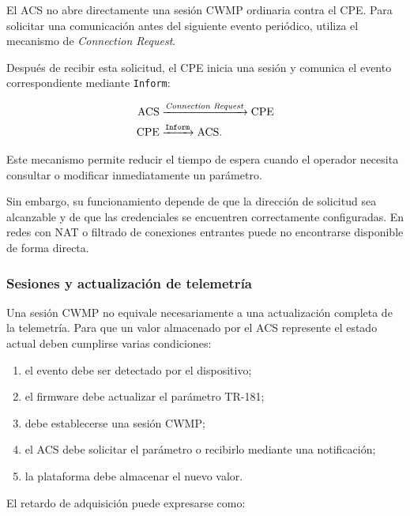 El ACS no abre directamente una sesión CWMP ordinaria contra el CPE. Para
solicitar una comunicación antes del siguiente evento periódico, utiliza
el mecanismo de \textit{Connection Request}.

Después de recibir esta solicitud, el CPE inicia una sesión y comunica el
evento correspondiente mediante \texttt{Inform}:

\[
\begin{aligned}
    \text{ACS}
    &\xrightarrow{\text{\textit{Connection Request}}}
    \text{CPE}\\
    \text{CPE}
    &\xrightarrow{\texttt{Inform}}
    \text{ACS}.
\end{aligned}
\]

Este mecanismo permite reducir el tiempo de espera cuando el operador
necesita consultar o modificar inmediatamente un parámetro.

Sin embargo, su funcionamiento depende de que la dirección de solicitud
sea alcanzable y de que las credenciales se encuentren correctamente
configuradas. En redes con NAT o filtrado de conexiones entrantes puede
no encontrarse disponible de forma directa.


\subsubsection*{Sesiones y actualización de telemetría}

Una sesión CWMP no equivale necesariamente a una actualización completa
de la telemetría. Para que un valor almacenado por el ACS represente el
estado actual deben cumplirse varias condiciones:

\begin{enumerate}
    \item el evento debe ser detectado por el dispositivo;

    \item el firmware debe actualizar el parámetro TR-181;

    \item debe establecerse una sesión CWMP;

    \item el ACS debe solicitar el parámetro o recibirlo mediante una
    notificación;

    \item la plataforma debe almacenar el nuevo valor.
\end{enumerate}

El retardo de adquisición puede expresarse como:


